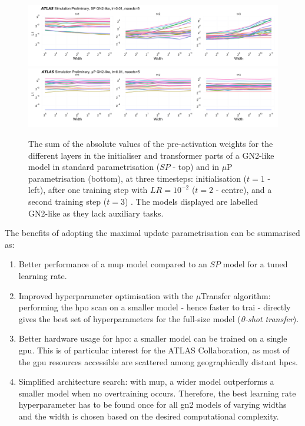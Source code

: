\begin{figure}[h!]
  \centering
  \includegraphics[width=\textwidth]{Images/FTAG/GN/HPO/spweights.png}\\
  \includegraphics[width=\textwidth]{Images/FTAG/GN/HPO/mupweights.png}
  \caption{The sum of the absolute values of the pre-activation weights for the different layers in the initialiser and transformer parts of a GN2-like model in standard parametrisation ($SP$ - top) and in $\mu$P parametrisation (bottom), at three timesteps: initialisation ($t=1$ - left), after one training step with $LR = 10^{-2}$ ($t=2$ - centre), and a second training step ($t=3$) \cite{publicplotMUP}. The models displayed are labelled GN2-like as they lack auxiliary tasks.}
  \label{fig:muspweights}
\end{figure} 
\vspace{-0.3cm}
The benefits of adopting the maximal update parametrisation can be summarised as:
\begin{enumerate}
  \item Better performance of a \gls{mup} model compared to an $SP$ model for a tuned learning rate.
  \item Improved hyperparameter optimisation with the $\mu$Transfer algorithm: performing the \gls{hpo} scan on a smaller model - hence faster to trai - directly gives the best set of hyperparameters for the full-size model (\textit{0-shot transfer}). 
  \item Better hardware usage for \gls{hpo}: a smaller model can be trained on a single \gls{gpu}. This is of particular interest for the ATLAS Collaboration, as most of the \gls{gpu} resources accessible are scattered among geographically distant \glspl{hpc}.  
  \item Simplified architecture search: with \gls{mup}, a wider model outperforms a smaller model when no overtraining occurs. Therefore, the best learning rate hyperparameter has to be found once for all \gls{gn2} models of varying widths and the width is chosen based on the desired computational complexity.
\end{enumerate}

